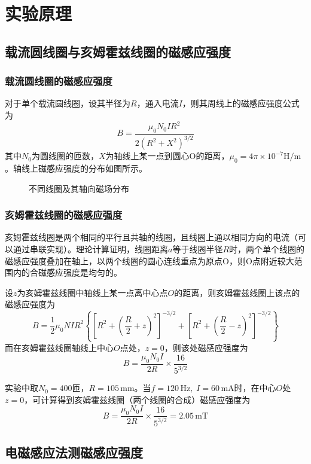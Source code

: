 \documentclass[12pt]{article}
\begin{document}
\section{实验原理}
\subsection{载流圆线圈与亥姆霍兹线圈的磁感应强度}
\subsubsection{载流圆线圈的磁感应强度}
对于单个载流圆线圈，设其半径为$R$，通入电流$I$，则其周线上的磁感应强度公式为
\[
    B=\frac{\mu_0N_0IR^2}{2(R^2+X^2)^{3/2}}
\]
其中$N_0$为圆线圈的匝数，$X$为轴线上某一点到圆心O的距离，$\mu_0=4\pi\times10^{-7}\mathrm{H/m}$。轴线上磁感应强度的分布如图所示。

\begin{figure}[htbp]
    \centering
    \caption{不同线圈及其轴向磁场分布}
\end{figure}

\subsubsection{亥姆霍兹线圈的磁感应强度}
亥姆霍兹线圈是两个相同的平行且共轴的线圈，且线圈上通以相同方向的电流（可以通过串联实现）。理论计算证明，线圈距离$a$等于线圈半径$R$时，两个单个线圈的磁感应强度叠加在轴上，以两个线圈的圆心连线重点为原点O，则O点附近较大范围内的合磁感应强度是均匀的。

设$ z $为亥姆霍兹线圈中轴线上某一点离中心点$ O $的距离，则亥姆霍兹线圈上该点的磁感应强度为
\[
    B=\frac12\mu_0NIR^2\left\{\left[R^2+\left(\frac R2+z\right)^2\right]^{-3/2}+\left[R^2+\left(\frac R2-z\right)^2\right]^{-3/2}\right\}
\]
而在亥姆霍兹线圈轴线上中心$ O $点处，$ z=0 $，则该处磁感应强度为
\[
    B=\frac{\mu_0N_0I}{2R}\times\frac{16}{5^{3/2}}
\]

实验中取$ N_0=400 $匝，$ R=105\,\mathrm{mm} $。当$ f=120\,\mathrm{Hz},\;I=60\,\mathrm{mA} $时，在中心$ O $处$ z=0 $，可计算得到亥姆霍兹线圈（两个线圈的合成）磁感应强度为
\[
    B=\frac{\mu_0N_0I}{2R}\times\frac{16}{5^{3/2}}=2.05\,\mathrm{mT}
\]

\subsection{电磁感应法测磁感应强度}
\end{document}
